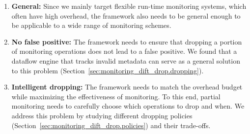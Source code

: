 \begin{enumerate}
  \item \textbf{General:} Since we mainly target flexible run-time monitoring
  systems, which often have high overhead, the framework also needs to be
  general enough to be applicable to a wide range of monitoring schemes.

  \item \textbf{No false positive:} The framework needs to ensure that dropping
  a portion of monitoring operations does not lead to a false positive. We
  found that a dataflow engine that tracks invalid metadata can serve as a
  general solution to this problem
  (Section~\ref{sec:monitoring_dift_drop.dropping}).

  \item \textbf{Intelligent dropping:} The framework needs to match the
  overhead budget while maximizing the effectiveness of monitoring. To this
  end, partial monitoring needs to carefully choose which operations to drop
  and when. We address this problem by studying different dropping policies
  (Section~\ref{sec:monitoring_dift_drop.policies}) and their trade-offs.
\end{enumerate}

